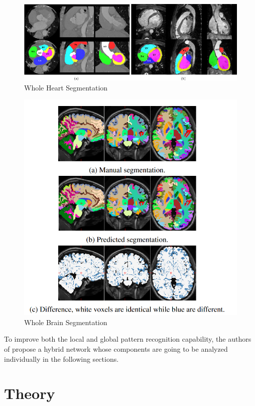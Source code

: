 \documentclass{IEEEtran}
\begin{document}
\begin{figure}[h]
    \centering
    \includegraphics[width=\textwidth]{img/heartseg1.jpg}
    \caption{Whole Heart Segmentation \cite{ZHUANG2019101537}}\label{fig:heartseg}
    \end{figure}

\begin{figure}[h]
    \centering
    \includegraphics[width=\textwidth]{img/brainseg.png}
    \caption{Whole Brain Segmentation \cite{de2015deep}}\label{fig:brainseg}
    \end{figure}


To improve both the local and global pattern recognition capability, the authors of \cite{chen2021transunet} propose a hybrid network whose components are going to be analyzed individually in the following sections. 

\section{Theory}
\end{document}
